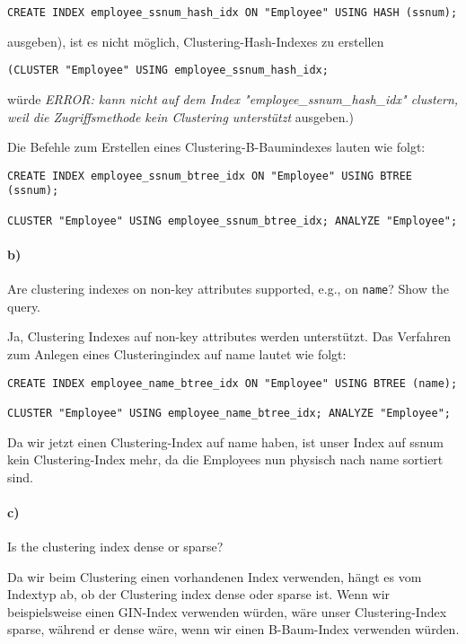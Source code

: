 \documentclass[11pt]{scrartcl}
\begin{document}
\begin{lstlisting}[style=dbtsql]
CREATE INDEX employee_ssnum_hash_idx ON "Employee" USING HASH (ssnum);
\end{lstlisting}

ausgeben), ist es nicht möglich, Clustering-Hash-Indexes zu erstellen 
\begin{lstlisting}[style=dbtsql]
(CLUSTER "Employee" USING employee_ssnum_hash_idx;
\end{lstlisting} 
würde \textit{ERROR: kann nicht auf dem Index "employee\_ssnum\_hash\_idx" clustern, weil die Zugriffsmethode kein Clustering unterstützt} ausgeben.) \newline


Die Befehle zum Erstellen eines Clustering-B-Baumindexes lauten wie folgt:
\begin{lstlisting}[style=dbtsql]
CREATE INDEX employee_ssnum_btree_idx ON "Employee" USING BTREE (ssnum);

CLUSTER "Employee" USING employee_ssnum_btree_idx; ANALYZE "Employee";
\end{lstlisting}

\paragraph{b)}

Are clustering indexes on non-key attributes supported, e.g., on \texttt{name}? Show the query.

Ja, Clustering Indexes auf non-key attributes werden unterstützt. Das Verfahren zum Anlegen eines Clusteringindex auf name lautet wie folgt:

\begin{lstlisting}[style=dbtsql]
CREATE INDEX employee_name_btree_idx ON "Employee" USING BTREE (name);

CLUSTER "Employee" USING employee_name_btree_idx; ANALYZE "Employee";
\end{lstlisting}

Da wir jetzt einen Clustering-Index auf name haben, ist unser Index auf ssnum kein Clustering-Index mehr, da die Employees nun physisch nach name sortiert sind.

\paragraph{c)}

Is the clustering index dense or sparse?

Da wir beim Clustering einen vorhandenen Index verwenden, hängt es vom Indextyp ab, ob der Clustering index dense oder sparse ist. Wenn wir beispielsweise einen GIN-Index verwenden würden, wäre unser Clustering-Index sparse, während er dense wäre, wenn wir einen B-Baum-Index verwenden würden.
\end{document}
